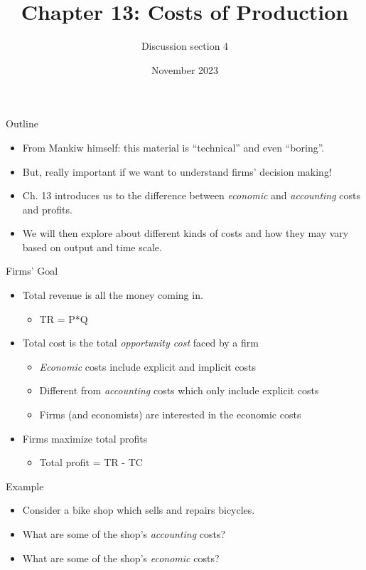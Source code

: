 \documentclass[aspectratio=169]{beamer}
\title{Chapter 13: Costs of Production}
\author{Discussion section 4}
\date{November 2023}
\begin{document}
\begin{frame}
    \titlepage 
\end{frame}

\begin{frame}{Outline}
    \begin{itemize}
        \item From Mankiw himself: this material is ``technical'' and even ``boring''.
        \item But, really important if we want to understand firms' decision making!
        \item Ch. 13 introduces us to the difference between \textit{economic} and \textit{accounting} costs and profits.
        \item We will then explore about different kinds of costs and how they may vary based on output and time scale.
    \end{itemize}
\end{frame}

\begin{frame}{Firms' Goal}
    \begin{itemize}
        \item Total revenue is all the money coming in.
            \begin{itemize}
                \item TR = P*Q
            \end{itemize}
        \item Total cost is the total \textit{opportunity cost} faced by a firm
            \begin{itemize}
                \item \textit{Economic} costs include explicit and implicit costs
                \item Different from \textit{accounting} costs which only include explicit costs
                \item Firms (and economists) are interested in the economic costs
            \end{itemize}
        \item Firms maximize total profits
            \begin{itemize}
                \item Total profit = TR - TC
            \end{itemize}
    \end{itemize}
\end{frame}

\begin{frame}{Example}
    \begin{itemize}
        \item Consider a bike shop which sells and repairs bicycles.
        \item What are some of the shop's \textit{accounting} costs?
        \item What are some of the shop's \textit{economic} costs?
    \end{itemize}
\end{frame}
\end{document}
